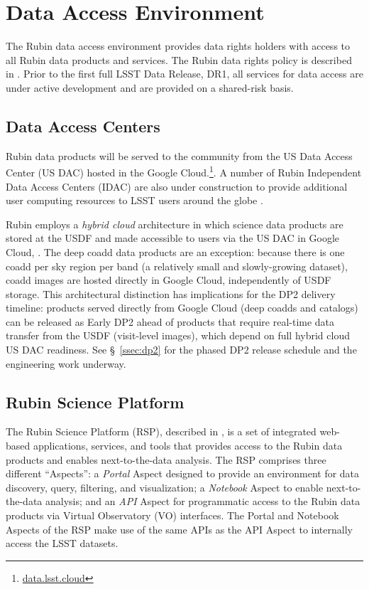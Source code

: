 \section{Data Access Environment}
\label{ses:access}

The Rubin data access environment provides data rights holders with access to all Rubin data products and services.
The Rubin data rights policy is described in .
Prior to the first full LSST Data Release, DR1, all services for data access are under active development and are provided on a shared-risk basis.

\subsection{Data Access Centers}
\label{ssec:dacs}
Rubin data products will be served to the community from the US Data Access Center (US DAC) hosted in the Google Cloud.\footnote{\url{data.lsst.cloud}}.
A number of Rubin Independent Data Access Centers (IDAC) are also under construction to provide additional user computing resources to LSST users around the globe .

Rubin employs a \emph{hybrid cloud} architecture in which science data products are stored at the USDF and made accessible to users via the US DAC in Google  Cloud, \cite[][]{2024SPIE13101E..2BO}.
The deep coadd data products are an exception: because there is one coadd per sky region per band (a relatively small and slowly-growing dataset), coadd images are hosted directly in Google Cloud, independently of USDF storage.
This architectural distinction has implications for the DP2 delivery timeline: products served directly from Google Cloud (deep coadds and catalogs) can be released as Early DP2 ahead of products that require real-time data transfer from the USDF (visit-level images), which depend on full hybrid cloud US DAC readiness.
See \S~\ref{ssec:dp2} for the phased DP2 release schedule and the engineering  work underway.

\subsection{Rubin Science Platform}
\label{ssec:rsp}
The Rubin Science Platform (RSP), described in , is a set of integrated web-based applications, services, and tools that provides access to the Rubin data products and enables next-to-the-data analysis.
The RSP comprises three different ``Aspects'': a \emph{Portal} Aspect designed to provide an environment for data discovery, query, filtering, and visualization; a \emph{Notebook} Aspect to enable next-to-the-data analysis; and an \emph{API} Aspect for programmatic access to the Rubin data products via Virtual Observatory (VO) interfaces.
The Portal and Notebook Aspects of the RSP make use of the same APIs as the API Aspect to internally access the LSST datasets.

